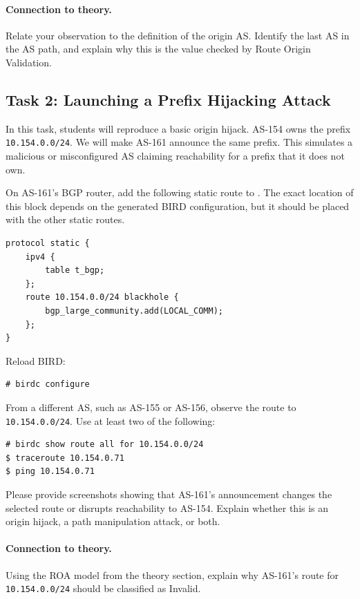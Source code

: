 \paragraph{Connection to theory.}
Relate your observation to the definition of the origin AS. Identify the last
AS in the AS path, and explain why this is the value checked by Route Origin
Validation.


\subsection{Task 2: Launching a Prefix Hijacking Attack}

In this task, students will reproduce a basic origin hijack. AS-154 owns the
prefix \texttt{10.154.0.0/24}. We will make AS-161 announce the same prefix.
This simulates a malicious or misconfigured AS claiming reachability for a
prefix that it does not own.

On AS-161's BGP router, add the following static route to
. The exact location of this block depends on the
generated BIRD configuration, but it should be placed with the other static
routes.

\begin{lstlisting}
protocol static {
    ipv4 {
        table t_bgp;
    };
    route 10.154.0.0/24 blackhole {
        bgp_large_community.add(LOCAL_COMM);
    };
}
\end{lstlisting}

Reload BIRD:

\begin{lstlisting}
# birdc configure
\end{lstlisting}

From a different AS, such as AS-155 or AS-156, observe the route to
\texttt{10.154.0.0/24}. Use at least two of the following:

\begin{lstlisting}
# birdc show route all for 10.154.0.0/24
$ traceroute 10.154.0.71
$ ping 10.154.0.71
\end{lstlisting}

Please provide screenshots showing that AS-161's announcement changes the
selected route or disrupts reachability to AS-154. Explain whether this is an
origin hijack, a path manipulation attack, or both.

\paragraph{Connection to theory.}
Using the ROA model from the theory section, explain why AS-161's route for
\texttt{10.154.0.0/24} should be classified as Invalid.


